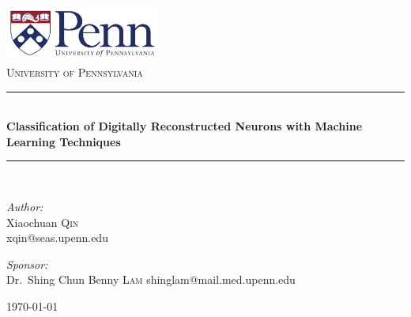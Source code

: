 \documentclass[letterpaper,11pt,oneside]{article}
\newcommand{\HRule}{\rule{\linewidth}{0.5mm}}
\begin{document}
\begin{titlepage}\begin{center}
\includegraphics[width=2in]{./upenn_logo.png}\\[1cm]
\textsc{\LARGE University of Pennsylvania}\\[0.5in]
\HRule \\[0.4cm]
{ \huge \bfseries Classification of Digitally Reconstructed Neurons with Machine Learning Techniques}\\[0.4cm]
\HRule \\[1.5cm]
\begin{minipage}{0.4\textwidth}
\begin{flushleft} \large
\emph{Author:}\\
Xiaochuan \textsc{Qin}\\
xqin@seas.upenn.edu
\end{flushleft}
\end{minipage}
\begin{minipage}{0.4\textwidth}
\begin{flushright} \large
\emph{Sponsor:} \\
Dr.~Shing Chun Benny \textsc{Lam}
shinglam@mail.med.upenn.edu
\end{flushright}
\end{minipage}
\vfill
{\large \today}
\end{center}\end{titlepage}
\end{document}
